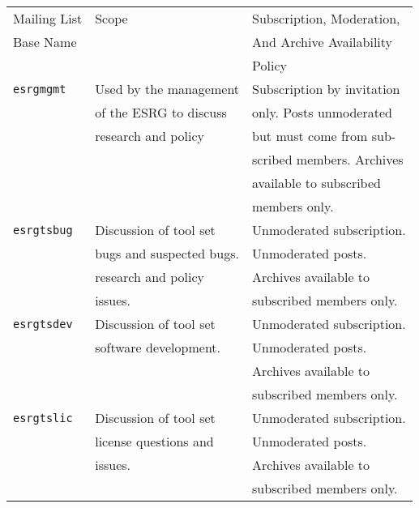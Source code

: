 \begin{table}
\begin{center}
\begin{tabular}{|l|l|l|}
\hline
Mailing List         & Scope                    & Subscription, Moderation, \\
Base Name            &                          & And Archive Availability  \\
                     &                          & Policy                    \\
\hline
\hline
\texttt{esrgmgmt}    & Used by the management   & Subscription by invitation\\
                     & of the ESRG to discuss   & only.  Posts unmoderated  \\
                     & research and policy      & but must come from sub-   \\
                     &                          & scribed members.  Archives\\
                     &                          & available to subscribed   \\
                     &                          & members only.             \\
\hline
\texttt{esrgtsbug}   & Discussion of tool set   & Unmoderated subscription. \\
                     & bugs and suspected bugs. & Unmoderated posts.        \\
                     & research and policy      & Archives available to     \\
                     & issues.                  & subscribed members only.  \\
\hline
\texttt{esrgtsdev}   & Discussion of tool set   & Unmoderated subscription. \\
                     & software development.    & Unmoderated posts.        \\
                     &                          & Archives available to     \\
                     &                          & subscribed members only.  \\
\hline
\texttt{esrgtslic}   & Discussion of tool set   & Unmoderated subscription. \\
                     & license questions and    & Unmoderated posts.        \\
                     & issues.                  & Archives available to     \\
                     &                          & subscribed members only.  \\

\end{tabular}
\end{center}
\end{table}
